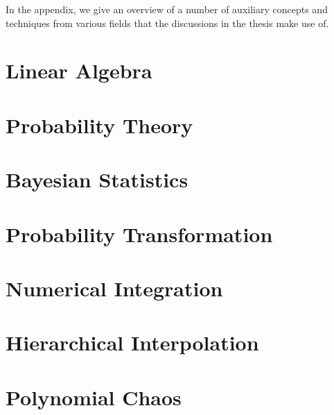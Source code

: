 In the appendix, we give an overview of a number of auxiliary concepts and
techniques from various fields that the discussions in the thesis make use of.

\section{Linear Algebra}

\section{Probability Theory}

\section{Bayesian Statistics}

\section{Probability Transformation}

\section{Numerical Integration}

\section{Hierarchical Interpolation}

\section{Polynomial Chaos}
